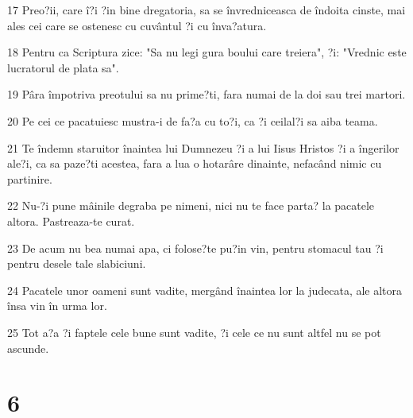 \par 17 Preo?ii, care î?i ?in bine dregatoria, sa se învredniceasca de îndoita cinste, mai ales cei care se ostenesc cu cuvântul ?i cu înva?atura.
\par 18 Pentru ca Scriptura zice: "Sa nu legi gura boului care treiera", ?i: "Vrednic este lucratorul de plata sa".
\par 19 Pâra împotriva preotului sa nu prime?ti, fara numai de la doi sau trei martori.
\par 20 Pe cei ce pacatuiesc mustra-i de fa?a cu to?i, ca ?i ceilal?i sa aiba teama.
\par 21 Te îndemn staruitor înaintea lui Dumnezeu ?i a lui Iisus Hristos ?i a îngerilor ale?i, ca sa paze?ti acestea, fara a lua o hotarâre dinainte, nefacând nimic cu partinire.
\par 22 Nu-?i pune mâinile degraba pe nimeni, nici nu te face parta? la pacatele altora. Pastreaza-te curat.
\par 23 De acum nu bea numai apa, ci folose?te pu?in vin, pentru stomacul tau ?i pentru desele tale slabiciuni.
\par 24 Pacatele unor oameni sunt vadite, mergând înaintea lor la judecata, ale altora însa vin în urma lor.
\par 25 Tot a?a ?i faptele cele bune sunt vadite, ?i cele ce nu sunt altfel nu se pot ascunde.

\chapter{6}

